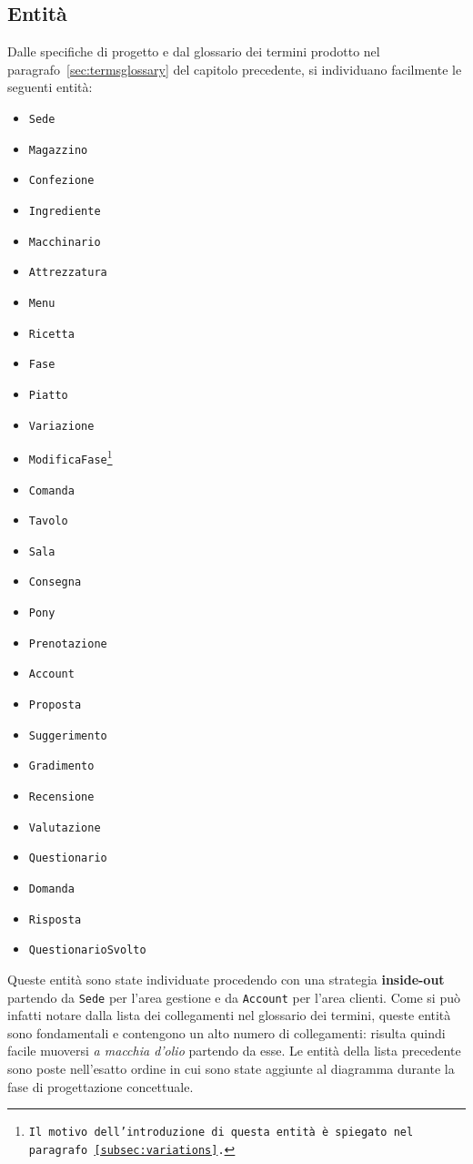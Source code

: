 \subsection{Entità}
Dalle specifiche di progetto e dal glossario dei termini prodotto nel
paragrafo~\vref{sec:termsglossary} del capitolo precedente, si individuano facilmente
le seguenti entità:
\begin{multicols}{3}
\begin{itemize}
    \item\tt Sede
    \item\tt Magazzino
    \item\tt Confezione
    \item\tt Ingrediente
    \item\tt Macchinario
    \item\tt Attrezzatura
    \item\tt Menu
    \item\tt Ricetta
    \item\tt Fase
    \item\tt Piatto
    \item\tt Variazione
    \item\tt ModificaFase\footnote{Il motivo dell'introduzione di questa entità è spiegato nel paragrafo \vref{subsec:variations}.}
    \item\tt Comanda
    \item\tt Tavolo
    \item\tt Sala
    \item\tt Consegna
    \item\tt Pony
    \item\tt Prenotazione
\end{itemize}
\begin{itemize}
    \item\tt Account
    \item\tt Proposta
    \item\tt Suggerimento
    \item\tt Gradimento
    \item\tt Recensione
    \item\tt Valutazione
    \item\tt Questionario
    \item\tt Domanda
    \item\tt Risposta
    \item\tt QuestionarioSvolto
\end{itemize}
\end{multicols}
Queste entità sono state individuate procedendo con una strategia {\bf inside-out}
partendo da {\tt Sede} per l'area gestione e da {\tt Account} per l'area clienti. Come
si può infatti notare dalla lista dei collegamenti nel glossario dei termini, queste
entità sono fondamentali e contengono un alto numero di collegamenti: risulta quindi
facile muoversi {\it a macchia d'olio} partendo da esse.
Le entità della lista precedente sono poste nell'esatto ordine in cui sono state
aggiunte al diagramma durante la fase di progettazione concettuale.
